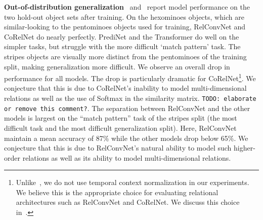 \textbf{Out-of-distribution generalization}~ and~ report model performance on the two hold-out object sets after training. On the hexominoes objects, which are similar-looking to the pentominoes objects used for training, RelConvNet and CoRelNet do nearly perfectly. PrediNet and the Transformer do well on the simpler tasks, but struggle with the more difficult `match pattern' task. The stripes objects are visually more distinct from the pentominoes of the training split, making generalization more difficult. We observe an overall drop in performance for all models. The drop is particularly dramatic for CoRelNet\footnote{Unlike~\citep{kergNeuralArchitecture2022}, we do not use temporal context normalization in our experiments. We believe this is the appropriate choice for evaluating relational architectures such as RelConvNet and CoRelNet. We discuss this choice in~.}. We conjecture that this is due to CoRelNet's inability to model multi-dimensional relations as well as the use of Softmax in the similarity matrix. \texttt{TODO: elaborate or remove this comment?}. The separation between RelConvNet and the other models is largest on the ``match pattern'' task of the stripes split (the most difficult task and the most difficult generalization split). Here, RelConvNet maintain a mean accuracy of 87\% while the other models drop below 65\%. We conjecture that this is due to RelConvNet's natural ability to model such higher-order relations as well as its ability to model multi-dimensional relations.